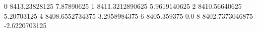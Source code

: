 0 8413.23828125 7.87890625
1 8411.3212890625 5.9619140625
2 8410.56640625 5.20703125
4 8408.6552734375 3.2958984375
6 8405.359375 0.0
8 8402.7373046875 -2.6220703125
